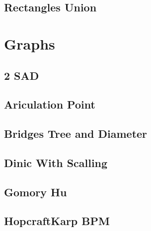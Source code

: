 \subsection{Rectangles Union}
\vspace{-2ex}
\raggedbottom
\vspace{-3.2ex}
\hrulefill

\section{Graphs}
\subsection{2 SAD}
\vspace{-2ex}
\raggedbottom
\vspace{-3.2ex}
\hrulefill
\subsection{Ariculation Point}
\vspace{-2ex}
\raggedbottom
\vspace{-3.2ex}
\hrulefill
\subsection{Bridges Tree and Diameter}
\vspace{-2ex}
\raggedbottom
\vspace{-3.2ex}
\hrulefill
\subsection{Dinic With Scalling}
\vspace{-2ex}
\raggedbottom
\vspace{-3.2ex}
\hrulefill
\subsection{Gomory Hu}
\vspace{-2ex}
\raggedbottom
\vspace{-3.2ex}
\hrulefill
\subsection{HopcraftKarp BPM}
\vspace{-2ex}
\raggedbottom
\vspace{-3.2ex}
\hrulefill
